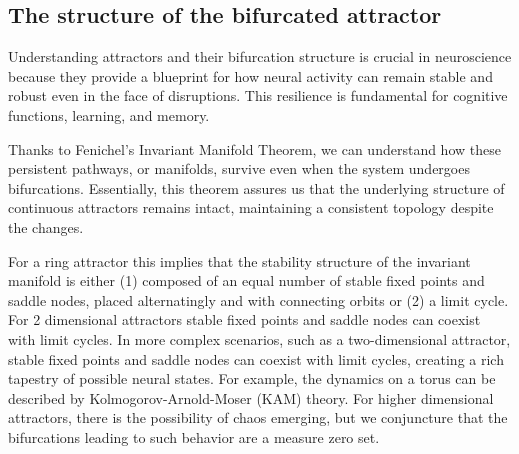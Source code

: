 \documentclass{article} %
\newcounter{ct}
\theoremstyle{definition}
\theoremstyle{remark}
\begin{document}



\subsection{The structure of the bifurcated attractor}\label{sec:attractor_bif}

Understanding attractors and their bifurcation structure is crucial in neuroscience because they provide a blueprint for how neural activity can remain stable and robust even in the face of disruptions.
 This resilience is fundamental for cognitive functions, learning, and memory. 


Thanks to Fenichel's Invariant Manifold Theorem, we can understand how these persistent pathways, or manifolds, survive even when the system undergoes  bifurcations.
Essentially, this theorem assures us that the underlying structure of continuous attractors remains intact, maintaining a consistent topology despite the changes.

For a ring attractor this implies that the stability structure of the invariant manifold is either 
(1)  composed of an equal number of stable fixed points and saddle nodes, placed alternatingly and with connecting orbits 
or (2) a limit cycle.
For 2 dimensional attractors  stable fixed points and saddle nodes can coexist with limit cycles.
In more complex scenarios, such as a two-dimensional attractor, stable fixed points and saddle nodes can coexist with limit cycles, creating a rich tapestry of possible neural states.
For example, the dynamics on a torus can be described by Kolmogorov-Arnold-Moser (KAM) theory.
For higher dimensional attractors, there is the possibility of chaos emerging, but we conjuncture that the bifurcations leading to such behavior are a measure zero set.
\end{document}
